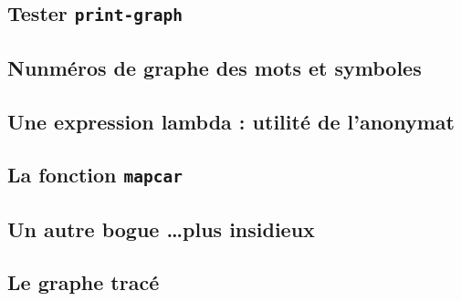  \subsection{Tester \texttt{print-graph}}

 \subsection{Nunméros de graphe des mots et symboles}

\subsection{Une expression lambda : utilité de
  l'anonymat}

 \subsection{La fonction \texttt{mapcar}}

 \subsection{Un autre bogue \dots plus insidieux}

 \subsection{Le graphe tracé}
